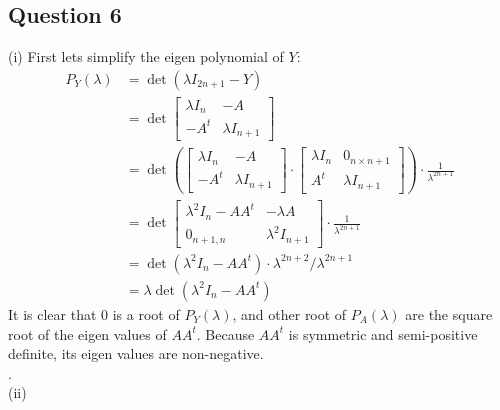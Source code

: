 \documentclass[pdf]{article}
\begin{document}
\subsection{Question 6}
(i) First lets simplify the eigen polynomial of $Y$:
\begin{align*}
P_Y(\lambda)&= \det(\lambda I_{2n+1} - Y) \\
&= \det\begin{bmatrix}
\lambda I_n & -A\\
-A^t & \lambda I_{n+1}
\end{bmatrix}\\
& =\det\left( \begin{bmatrix}
\lambda I_n & -A\\
-A^t & \lambda I_{n+1}
\end{bmatrix}\cdot \begin{bmatrix}
\lambda I_n & 0_{n\times n+1}\\
A^t & \lambda I_{n+1}
\end{bmatrix}\right)\cdot \frac{1}{\lambda ^{2n+1}}\\
&=\det\begin{bmatrix}
\lambda^2 I_n - AA^t & -\lambda A\\
0_{n+1,n} & \lambda^2  I_{n+1}
\end{bmatrix} \cdot \frac{1}{\lambda ^{2n+1}}\\
&=\det(\lambda^2 I_n - AA^t)\cdot \lambda ^{2n+2}/ \lambda ^{2n+1}\\
&=\lambda \det(\lambda^2 I_n - AA^t)
\end{align*}
It is clear that $0$ is a root of $P_Y(\lambda)$, and other root of $P_A(\lambda )$ are the square root of the eigen values of $AA^t$. Because $AA^t$ is symmetric and semi-positive definite, its eigen values are non-negative.\\ 
 .\\
(ii)

\newpage
\end{document}
